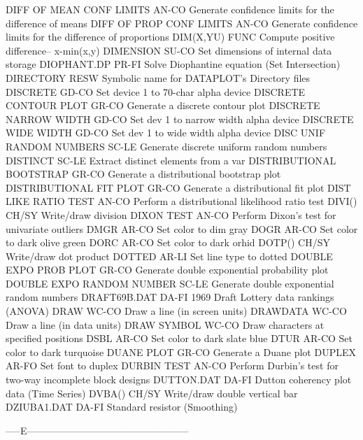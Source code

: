 DIFF OF MEAN CONF LIMITS    AN-CO Generate confidence limits for the difference of means
DIFF OF PROP CONF LIMITS    AN-CO Generate confidence limits for the difference of proportions
DIM(X,YU)                   FUNC  Compute positive difference-- x-min(x,y)
DIMENSION                   SU-CO Set dimensions of internal data storage
DIOPHANT.DP                 PR-FI Solve Diophantine equation (Set Intersection)
DIRECTORY                   RESW  Symbolic name for DATAPLOT's Directory files
DISCRETE                    GD-CO Set device 1 to  70-char alpha device
DISCRETE CONTOUR PLOT       GR-CO Generate a discrete contour plot
DISCRETE NARROW WIDTH       GD-CO Set dev 1 to narrow width alpha device
DISCRETE WIDE WIDTH         GD-CO Set dev 1 to wide width alpha device
DISC UNIF RANDOM NUMBERS    SC-LE Generate discrete uniform random numbers
DISTINCT                    SC-LE Extract distinct elements from a var
DISTRIBUTIONAL BOOTSTRAP    GR-CO Generate a distributional bootstrap plot
DISTRIBUTIONAL FIT PLOT     GR-CO Generate a distributional fit plot
DIST LIKE RATIO TEST        AN-CO Perform a distributional likelihood ratio test
DIVI()                      CH/SY Write/draw division
DIXON TEST                  AN-CO Perform Dixon's test for univariate outliers
DMGR                        AR-CO Set color to dim gray
DOGR                        AR-CO Set color to dark olive green
DORC                        AR-CO Set color to dark orhid
DOTP()                      CH/SY Write/draw dot product
DOTTED                      AR-LI Set line type to dotted
DOUBLE EXPO PROB PLOT       GR-CO Generate double exponential probability plot
DOUBLE EXPO RANDOM NUMBER   SC-LE Generate double exponential random numbers
DRAFT69B.DAT                DA-FI 1969 Draft Lottery data rankings (ANOVA)
DRAW                        WC-CO Draw a line (in screen units)
DRAWDATA                    WC-CO Draw a line (in data units)
DRAW SYMBOL                 WC-CO Draw characters at specified positions
DSBL                        AR-CO Set color to dark slate blue
DTUR                        AR-CO Set color to dark turquoise
DUANE PLOT                  GR-CO Generate a Duane plot
DUPLEX                      AR-FO Set font to duplex
DURBIN TEST                 AN-CO Perform Durbin's test for two-way incomplete block designs
DUTTON.DAT                  DA-FI Dutton coherency plot data (Time Series)
DVBA()                      CH/SY Write/draw double vertical bar
DZIUBA1.DAT                 DA-FI Standard resistor (Smoothing)

-----E--------------------------------------------------

